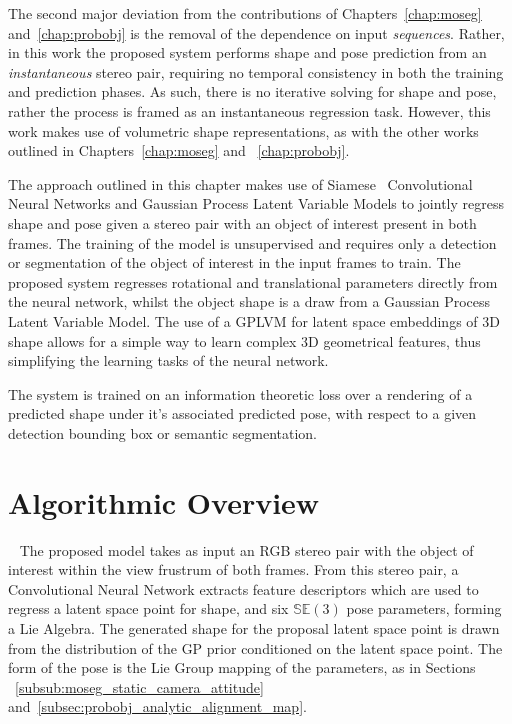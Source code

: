 The second major deviation from the contributions of Chapters~\ref{chap:moseg} and~\ref{chap:probobj} 
is the removal of the dependence on input \textit{sequences}. Rather, in this work 
the proposed system performs shape and pose prediction from an \textit{instantaneous}
stereo pair, requiring no temporal consistency in both the training and prediction 
phases. As such, there is no iterative solving for shape and pose, rather the process 
is framed as an instantaneous regression task. However, this work makes use of volumetric
shape representations, as with the other works outlined in Chapters~\ref{chap:moseg} and
~\ref{chap:probobj}.

The approach outlined in this chapter makes use of Siamese~\cite{SIAMESE} 
Convolutional Neural Networks and Gaussian Process Latent Variable Models to jointly regress 
shape and pose given a stereo pair with an object of interest present in both frames. The training of the 
model is unsupervised and requires only a detection or segmentation of the object of interest in the input 
frames to train. The proposed system regresses rotational and translational parameters directly 
from the neural network, whilst the object shape is a draw from a Gaussian Process 
Latent Variable Model. The use of a GPLVM for latent space embeddings of 3D shape 
allows for a simple way to learn complex 3D geometrical features, thus simplifying 
the learning tasks of the neural network.

The system is trained on an information theoretic loss over a rendering of a predicted 
shape under it's associated predicted pose, with respect to a given detection bounding box 
or semantic segmentation. 

\section{Algorithmic Overview}
~\label{sec:spp_algorithm}
The proposed model takes as input an RGB stereo pair with the object of interest within the 
view frustrum of both frames. From this stereo pair, a Convolutional Neural Network extracts 
feature descriptors which are used to regress a latent space point for shape, and six 
\( \mathbb{SE}(3) \) pose parameters, forming a Lie Algebra. The generated shape for the proposal 
latent space point is drawn from the distribution of the GP prior conditioned on the latent space 
point. The form of the pose is the Lie Group mapping of the parameters, as in Sections
~\ref{subsub:moseg_static_camera_attitude} and~\ref{subsec:probobj_analytic_alignment_map}. 

